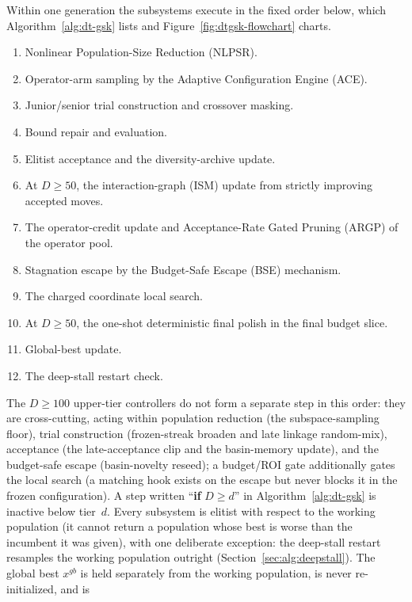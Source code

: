 %
Within one generation the subsystems execute in the fixed order below,
which Algorithm~\ref{alg:dt-gsk} lists and
Figure~\ref{fig:dtgsk-flowchart} charts.
\begin{enumerate}[itemsep=2pt,topsep=4pt,leftmargin=*,label=(\arabic*)]
\item Nonlinear Population-Size Reduction (NLPSR).
\item Operator-arm sampling by the Adaptive Configuration Engine (ACE).
\item Junior/senior trial construction and crossover masking.
\item Bound repair and evaluation.
\item Elitist acceptance and the diversity-archive update.
\item At $D\ge50$, the interaction-graph (ISM) update from strictly improving accepted moves.
\item The operator-credit update and Acceptance-Rate Gated Pruning (ARGP)
of the operator pool.
\item Stagnation escape by the Budget-Safe Escape (BSE) mechanism.
\item The charged coordinate local search.
\item At $D\ge50$, the one-shot deterministic final polish in the final
budget slice.
\item Global-best update.
\item The deep-stall restart check.
\end{enumerate}
The $D\ge100$ upper-tier controllers do not form a separate step in this order: they are cross-cutting, acting within population reduction (the subspace-sampling floor), trial construction (frozen-streak broaden and late linkage random-mix), acceptance (the late-acceptance clip and the basin-memory update), and the budget-safe escape (basin-novelty reseed); a budget/ROI gate additionally gates the local search (a matching hook exists on the escape but never blocks it in the frozen configuration).
A step written ``\textbf{if} $D\ge d$'' in Algorithm~\ref{alg:dt-gsk} is
inactive below tier~$d$. Every subsystem is elitist with respect to the
working population (it cannot return a population whose best is worse
than the incumbent it was given), with one deliberate exception: the
deep-stall restart resamples the working population outright
(Section~\ref{sec:alg:deepstall}). The global best $x^{gb}$ is held
separately from the working population, is never re-initialized, and is
